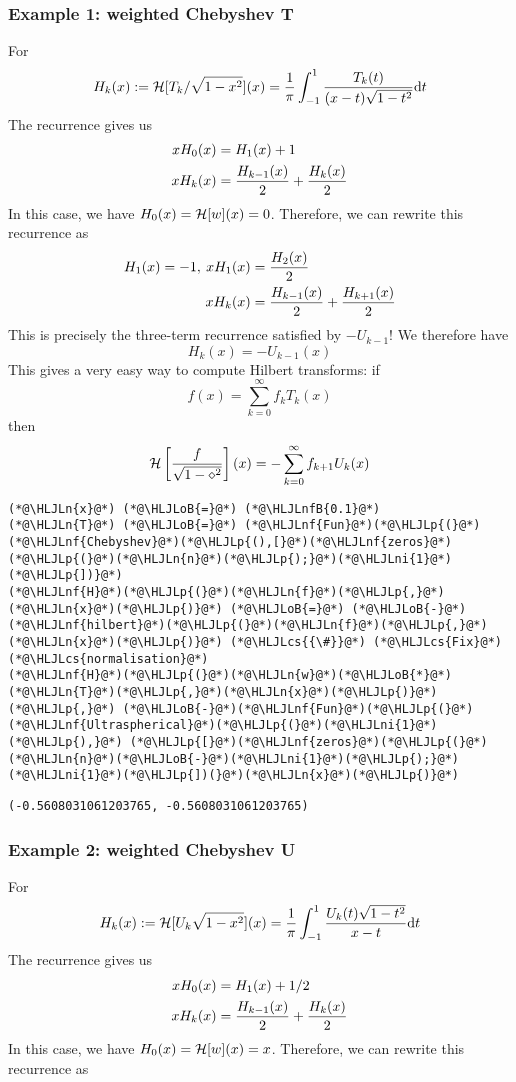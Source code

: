 \documentclass[12pt,landscape]{article}
\newcommand{\HLJLn}[1]{#1}
\newcommand{\HLJLnf}[1]{\textcolor[RGB]{66,102,213}{#1}}
\newcommand{\HLJLnfB}[1]{\textcolor[RGB]{59,151,46}{#1}}
\newcommand{\HLJLni}[1]{\textcolor[RGB]{59,151,46}{#1}}
\newcommand{\HLJLoB}[1]{\textcolor[RGB]{102,102,102}{\textbf{#1}}}
\newcommand{\HLJLp}[1]{#1}
\newcommand{\HLJLcs}[1]{\textcolor[RGB]{153,153,119}{\textit{#1}}}
\def\D{ {\rm d} }
\def\HH{ {\cal H} }
\def\dt{\D t}
\begin{document}
{\subsubsection{Example 1: weighted Chebyshev T}
For
\[
H_k(x) := \HH[T_k/\sqrt{1-x^2}](x) =  {1 \over \pi} \int_{-1}^1 {T_k(t) \over (x-t)\sqrt{1-t^2}} \dt
\]
The recurrence gives us
\begin{align*}
x H_0(x) &= H_1(x) + 1 \\
x H_k(x) &= {H_{k-1}(x) \over 2} + {H_k(x) \over 2} 
\end{align*}
In this case, we have $H_0(x) = \HH[w](x) =  0$. Therefore, we can rewrite this recurrence as 
\begin{align*}
H_1(x)= -1,\:  x H_1(x) &= {H_2(x) \over 2} \\
x H_k(x) &= {H_{k-1}(x) \over 2} + {H_{k+1}(x) \over 2} 
\end{align*}
This is precisely the three-term recurrence satisfied by $-U_{k-1}$! We therefore have
\[
H_k(x) = -U_{k-1}(x)
\]
This gives a very easy way to compute Hilbert transforms: if
\[
f(x) = \sum_{k=0}^\infty f_k T_k(x)
\]
then
\[
\HH\left[{f \over \sqrt{1-\diamond^2}}\right](x) = -\sum_{k=0}^\infty f_{k+1} U_k(x)
\]
\begin{lstlisting}
(*@\HLJLn{x}@*) (*@\HLJLoB{=}@*) (*@\HLJLnfB{0.1}@*)
(*@\HLJLn{T}@*) (*@\HLJLoB{=}@*) (*@\HLJLnf{Fun}@*)(*@\HLJLp{(}@*)(*@\HLJLnf{Chebyshev}@*)(*@\HLJLp{(),[}@*)(*@\HLJLnf{zeros}@*)(*@\HLJLp{(}@*)(*@\HLJLn{n}@*)(*@\HLJLp{);}@*)(*@\HLJLni{1}@*)(*@\HLJLp{])}@*)
(*@\HLJLnf{H}@*)(*@\HLJLp{(}@*)(*@\HLJLn{f}@*)(*@\HLJLp{,}@*)(*@\HLJLn{x}@*)(*@\HLJLp{)}@*) (*@\HLJLoB{=}@*) (*@\HLJLoB{-}@*)(*@\HLJLnf{hilbert}@*)(*@\HLJLp{(}@*)(*@\HLJLn{f}@*)(*@\HLJLp{,}@*)(*@\HLJLn{x}@*)(*@\HLJLp{)}@*) (*@\HLJLcs{{\#}}@*) (*@\HLJLcs{Fix}@*) (*@\HLJLcs{normalisation}@*)
(*@\HLJLnf{H}@*)(*@\HLJLp{(}@*)(*@\HLJLn{w}@*)(*@\HLJLoB{*}@*)(*@\HLJLn{T}@*)(*@\HLJLp{,}@*)(*@\HLJLn{x}@*)(*@\HLJLp{)}@*) (*@\HLJLp{,}@*) (*@\HLJLoB{-}@*)(*@\HLJLnf{Fun}@*)(*@\HLJLp{(}@*)(*@\HLJLnf{Ultraspherical}@*)(*@\HLJLp{(}@*)(*@\HLJLni{1}@*)(*@\HLJLp{),}@*) (*@\HLJLp{[}@*)(*@\HLJLnf{zeros}@*)(*@\HLJLp{(}@*)(*@\HLJLn{n}@*)(*@\HLJLoB{-}@*)(*@\HLJLni{1}@*)(*@\HLJLp{);}@*)(*@\HLJLni{1}@*)(*@\HLJLp{])(}@*)(*@\HLJLn{x}@*)(*@\HLJLp{)}@*)
\end{lstlisting}

\begin{lstlisting}
(-0.5608031061203765, -0.5608031061203765)
\end{lstlisting}
\newpage
\subsubsection{Example 2: weighted Chebyshev U}
For
\[
H_k(x) := \HH[U_k \sqrt{1-x^2}](x) =  {1 \over \pi} \int_{-1}^1 {U_k(t) \sqrt{1-t^2} \over x-t} \dt
\]
The recurrence gives us
\begin{align*}
x H_0(x) &= H_1(x) + 1/2 \\
x H_k(x) &= {H_{k-1}(x) \over 2} + {H_k(x) \over 2} \\
\end{align*}
In this case, we have $H_0(x) = \HH[w](x) =  x$. Therefore, we can rewrite this recurrence as


}
\end{document}
